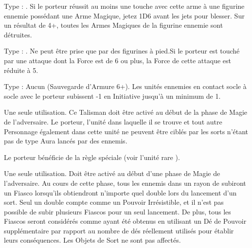 Type : \ironfist{}. Si le porteur réussit au moins une touche avec cette arme à une figurine ennemie possédant une Arme Magique, jetez 1D6 avant les jets pour blesser. Sur un résultat de 4+, toutes les Armes Magiques de la figurine ennemie sont détruites.

\endpricelist

\armymagicalarmour

\startpricelist

Type : \ha{}. Ne peut être prise que par des figurines à pied.\newline Si le porteur est touché par une attaque dont la Force est de 6 ou plus, la Force de cette attaque est réduite à 5.

Type : Aucun (Sauvegarde d'Armure 6+). Les unités ennemies en contact socle à socle avec le porteur subissent -1 en Initiative jusqu'à un minimum de 1.

\endpricelist

\armytalismans

\startpricelist

Une seule utilisation. Ce Talisman doit être activé au début de la phase de Magie de l'adversaire. Le porteur, l'unité dans laquelle il se trouve et tout autre Personnage également dans cette unité ne peuvent être ciblés par les sorts n'étant pas de type Aura lancés par des \wizards{} ennemis.

\endpricelist

\armyenchanteditems

\startpricelist

Le porteur bénéficie de la règle spéciale \stoneskin{} (voir l'unité rare \rockaurochs{}).

\endpricelist

\armyarcaneitems

\startpricelist

Une seule utilisation. Doit être activé au début d'une phase de Magie de l'adversaire. Au cours de cette phase, tous les \wizards{} ennemis dans un rayon de  subiront un Fiasco lorsqu'ils obtiendront n'importe quel double lors du lancement d'un sort. Seul un double  compte comme un Pouvoir Irrésistible, et il n'est pas possible de subir plusieurs Fiascos pour un seul lancement. De plus, tous les Fiascos seront considérés comme ayant été obtenus en utilisant un Dé de Pouvoir supplémentaire par rapport au nombre de dés réellement utilisés pour établir leurs conséquences. Les Objets de Sort ne sont pas affectés.

